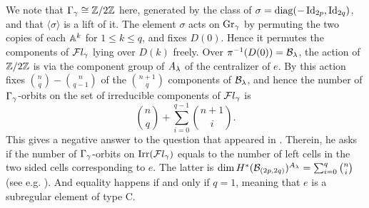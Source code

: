 \documentclass[11pt]{article}
\numberwithin{equation}{section}
\begin{document}
We note that $\Gamma_\gamma \cong\mathbb{Z}/2\mathbb{Z}$ here, generated by the class
of $\sigma=\operatorname{diag}(-\operatorname{Id}_{2p},\operatorname{Id}_{2q})$, and that $\langle\sigma\rangle$ is a lift of
it. The element $\sigma$ acts on $\operatorname{Gr}_\gamma$ by permuting the two
copies of each $\mathbb{A}^k$ for $1\leqslant k\leqslant q$, and fixes $D(0)$. Hence it
permutes the components of $\mathcal{F}l_\gamma$ lying over $D(k)$ freely. Over $\pi^{-1}(D(0))= \mathcal{B}_\lambda$, the action of $\mathbb{Z}/2\mathbb{Z}$ is via the component group of $A_\lambda$ of the centralizer of $e$. By \cite[Prop.~8.3]{Kim} this action fixes
$\binom{n}{q}-\binom{n}{q-1}$ of the $\binom{n+1}{q}$ components of
$\mathcal{B}_\lambda$, and hence the number of $\Gamma_\gamma$-orbits on the set of irreducible
components of $\mathcal{F}l_\gamma$ is
\[
\binom{n}{q}+\sum_{i=0}^{q-1}\binom{n+1}{i}.
\]
This gives a negative
answer to the question that appeared in \cite[Page 80]{Lusztigcomment}. Therein, he asks if the number of $\Gamma_\gamma$-orbits on $\operatorname{Irr}(\mathcal{F}l_\gamma)$ equals to the number of left cells in the two sided cells corresponding to $e$. The latter is $\dim H^*(\mathcal{B}_{(2p,2q)})^{A_\lambda}= \sum_{i=0}^{q}\binom{n}{i}$ (see e.g. \cite{Hoang2024Discretization}). And equality happens if and only if $q=1$, meaning that $e$ is a subregular element of type C.
\end{document}
